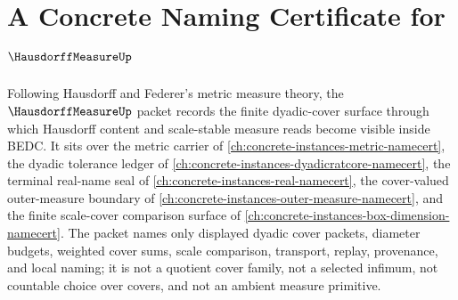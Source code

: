 \chapter{A Concrete Naming Certificate for $\HausdorffMeasureUp$}
\label{ch:concrete-instances-hausdorff-measure-namecert}

Following Hausdorff and Federer's metric measure theory, the $\HausdorffMeasureUp$ packet records the finite dyadic-cover surface through which Hausdorff content and scale-stable measure reads become visible inside BEDC. It sits over the metric carrier of \autoref{ch:concrete-instances-metric-namecert}, the dyadic tolerance ledger of \autoref{ch:concrete-instances-dyadicratcore-namecert}, the terminal real-name seal of \autoref{ch:concrete-instances-real-namecert}, the cover-valued outer-measure boundary of \autoref{ch:concrete-instances-outer-measure-namecert}, and the finite scale-cover comparison surface of \autoref{ch:concrete-instances-box-dimension-namecert}. The packet names only displayed dyadic cover packets, diameter budgets, weighted cover sums, scale comparison, transport, replay, provenance, and local naming; it is not a quotient cover family, not a selected infimum, not countable choice over covers, and not an ambient measure primitive.

